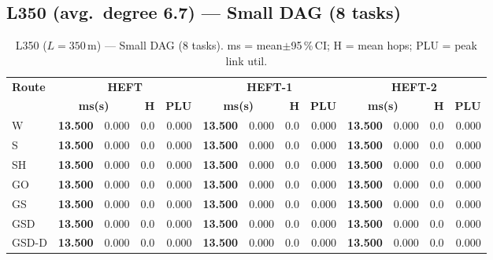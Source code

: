 \documentclass[11pt]{article}
\newcommand{\win}[1]{\textcolor{green!50!black}{\textbf{#1}}}
\begin{document}
\subsection{L350 (avg.\ degree 6.7) --- Small DAG (8 tasks)}
\begin{table}[H]\centering\small
\begin{tabular}{l r@{$\pm$}l r r r@{$\pm$}l r r r@{$\pm$}l r r}
\toprule
\textbf{Route} & \multicolumn{4}{c}{\textbf{HEFT}} & \multicolumn{4}{c}{\textbf{HEFT-1}} & \multicolumn{4}{c}{\textbf{HEFT-2}} \\
\cmidrule(lr){2-5}\cmidrule(lr){6-9}\cmidrule(lr){10-13}
& \multicolumn{2}{c}{\textbf{ms(s)}} & \textbf{H} & \textbf{PLU}& \multicolumn{2}{c}{\textbf{ms(s)}} & \textbf{H} & \textbf{PLU}& \multicolumn{2}{c}{\textbf{ms(s)}} & \textbf{H} & \textbf{PLU} \\
\midrule
  W & \win{13.500} & 0.000 & 0.0 & 0.000 & \win{13.500} & 0.000 & 0.0 & 0.000 & \win{13.500} & 0.000 & 0.0 & 0.000 \\
  S & \win{13.500} & 0.000 & 0.0 & 0.000 & \win{13.500} & 0.000 & 0.0 & 0.000 & \win{13.500} & 0.000 & 0.0 & 0.000 \\
  SH & \win{13.500} & 0.000 & 0.0 & 0.000 & \win{13.500} & 0.000 & 0.0 & 0.000 & \win{13.500} & 0.000 & 0.0 & 0.000 \\
  GO & \win{13.500} & 0.000 & 0.0 & 0.000 & \win{13.500} & 0.000 & 0.0 & 0.000 & \win{13.500} & 0.000 & 0.0 & 0.000 \\
  GS & \win{13.500} & 0.000 & 0.0 & 0.000 & \win{13.500} & 0.000 & 0.0 & 0.000 & \win{13.500} & 0.000 & 0.0 & 0.000 \\
  GSD & \win{13.500} & 0.000 & 0.0 & 0.000 & \win{13.500} & 0.000 & 0.0 & 0.000 & \win{13.500} & 0.000 & 0.0 & 0.000 \\
  GSD-D & \win{13.500} & 0.000 & 0.0 & 0.000 & \win{13.500} & 0.000 & 0.0 & 0.000 & \win{13.500} & 0.000 & 0.0 & 0.000 \\
\bottomrule\end{tabular}
\caption{L350 ($L=350$\,m) --- Small DAG (8 tasks). ms = mean$\pm$95\,\%\,CI; H = mean hops; PLU = peak link util.}
\end{table}
\end{document}
